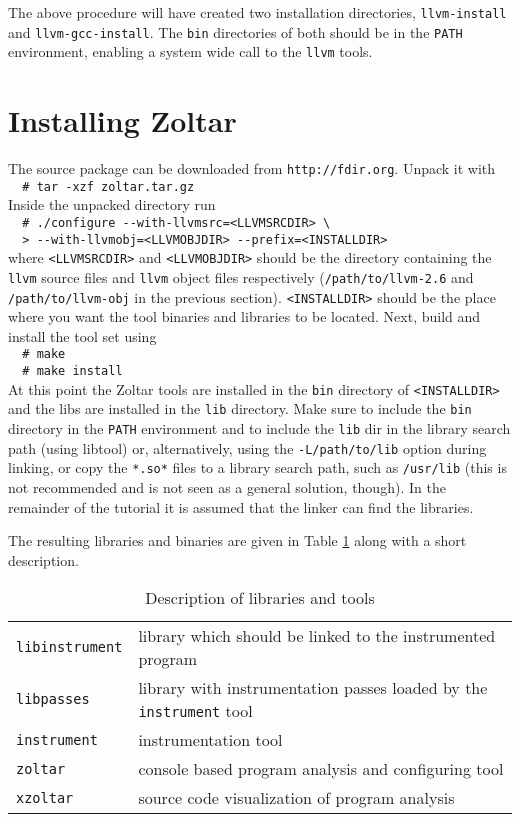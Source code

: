 The above procedure will have created two installation directories,
\verb|llvm-install| and \verb|llvm-gcc-install|.
The \verb|bin| directories of both should be in the \verb|PATH| environment,
enabling a system wide call to the \verb|llvm| tools.


\section{Installing Zoltar}

The source package can be downloaded from \verb|http://fdir.org|.
Unpack it with \\
\verb|  # tar -xzf zoltar.tar.gz|\\
Inside the unpacked directory run \\
\verb|  # ./configure --with-llvmsrc=<LLVMSRCDIR> \|\\
\verb|  > --with-llvmobj=<LLVMOBJDIR> --prefix=<INSTALLDIR>|\\
where \verb|<LLVMSRCDIR>| and
\verb|<LLVMOBJDIR>| should be the directory containing the 
\verb|llvm| source files and \verb|llvm| object files respectively
(\verb|/path/to/llvm-2.6| and \verb|/path/to/llvm-obj| in the previous section).
\verb|<INSTALLDIR>| should be the place where you want the tool binaries and libraries to
be located.
Next, build and install the tool set using \\
\verb|  # make|\\
\verb|  # make install|\\
At this point the Zoltar tools are installed in the \verb|bin| directory of \verb|<INSTALLDIR>|
and the libs are installed in the \verb|lib| directory.
Make sure to include the \verb|bin| directory in the \verb|PATH| environment 
and to include the \verb|lib| dir in the library search path (using libtool) or, alternatively,
using the \verb|-L/path/to/lib| option during linking, or
copy the \verb|*.so*| files to a library search path, such as \verb|/usr/lib|
(this is not recommended and is not seen as a general solution, though).
In the remainder of the tutorial it is assumed that the linker can find the libraries.

The resulting libraries and binaries are given in Table \ref{t:LibsAndTools} 
along with a short description.

\begin{table}
  \begin{tabular}{l|l}
    \hline
	\verb|libinstrument| & library which should be linked to the instrumented program \\
	\verb|libpasses|     & library with instrumentation passes loaded by the \verb|instrument| tool \\
	\verb|instrument|    & instrumentation tool \\
	\verb|zoltar|       & console based program analysis and configuring tool \\
	\verb|xzoltar|      & source code visualization of program analysis \\
    \hline
  \end{tabular}
  \caption{Description of libraries and tools}
  \label{t:LibsAndTools}
\end{table}


